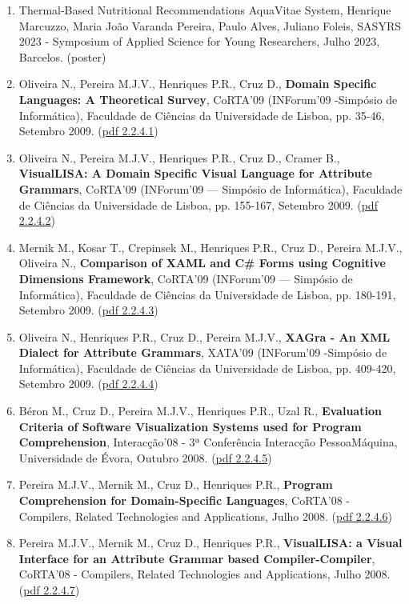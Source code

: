 \documentclass[11pt]{article}
\begin{document}
\begin{enumerate}

\item {Thermal-Based Nutritional Recommendations AquaVitae System, Henrique Marcuzzo, Maria João Varanda Pereira, Paulo Alves, Juliano Foleis, SASYRS 2023 - Symposium of Applied Science for Young Researchers, Julho 2023, Barcelos. (poster)}

\item {Oliveira N., Pereira M.J.V., Henriques P.R., Cruz D., {\bf{ Domain Specific Languages: A Theoretical Survey}}, CoRTA'09 (INForum'09 -Simpósio de Informática), Faculdade de Ciências da Universidade de Lisboa, pp. 35-46, Setembro 2009. (\href{run:Publicacoes/publicacoes/45.pdf}{pdf 2.2.4.1})}
\item {Oliveira N., Pereira M.J.V., Henriques P.R., Cruz D., Cramer B., {\bf{ VisualLISA: A Domain Specific Visual Language for Attribute Grammars}}, CoRTA'09 (INForum'09 --- Simpósio de Informática), Faculdade de Ciências da Universidade de Lisboa, pp. 155-167, Setembro 2009. (\href{run:Publicacoes/publicacoes/47.pdf}{pdf 2.2.4.2})}
\item {Mernik M., Kosar T., Crepinsek M., Henriques P.R., Cruz D., Pereira M.J.V., Oliveira N., {\bf{ Comparison of XAML and C\# Forms using Cognitive Dimensions Framework}}, CoRTA'09 (INForum'09 --- Simpósio de Informática), Faculdade de Ciências da Universidade de Lisboa, pp. 180-191, Setembro 2009. (\href{run:Publicacoes/publicacoes/41.pdf}{pdf 2.2.4.3})}
\item {Oliveira N., Henriques P.R., Cruz D., Pereira M.J.V., {\bf{ XAGra - An XML Dialect for Attribute Grammars}}, XATA'09 (INForum'09 -Simpósio de Informática), Faculdade de Ciências da Universidade de Lisboa, pp. 409-420, Setembro 2009. (\href{run:Publicacoes/publicacoes/46.pdf}{pdf 2.2.4.4})}
\item {Béron M., Cruz D., Pereira M.J.V., Henriques P.R., Uzal R., {\bf{ Evaluation Criteria of Software Visualization Systems used for Program Comprehension}}, Interacção'08 - 3ª Conferência Interacção Pessoa\-Máquina, Universidade de Évora, Outubro 2008. (\href{run:Publicacoes/publicacoes/37.pdf}{pdf 2.2.4.5})}
\item {Pereira M.J.V., Mernik M., Cruz D., Henriques P.R., {\bf{ Program Comprehension for Domain-Specific Languages}}, CoRTA'08 - Compilers, Related Technologies and Applications, Julho 2008. (\href{run:Publicacoes/publicacoes/29.pdf}{pdf 2.2.4.6})}
\item {Pereira M.J.V., Mernik M., Cruz D., Henriques P.R., {\bf{ VisualLISA: a Visual Interface for an Attribute Grammar based Compiler-Compiler}}, CoRTA'08 - Compilers, Related Technologies and Applications, Julho 2008. (\href{run:Publicacoes/publicacoes/35.pdf}{pdf 2.2.4.7})}

\end{enumerate}
\end{document}
